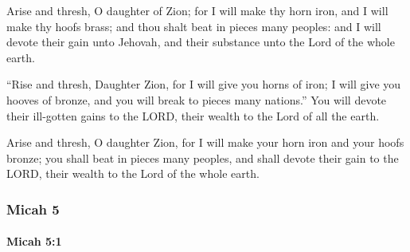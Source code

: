 			\begin{versebox}
					\item[BHS] 
					\item[LXX] 
					\item[ASV] Arise and thresh, O daughter of Zion; for I will make thy horn iron, and I will make thy hoofs brass; and thou shalt beat in pieces many peoples: and I will devote their gain unto Jehovah, and their substance unto the Lord of the whole earth.
					\item[NIV] “Rise and thresh, Daughter Zion, for I will give you horns of iron; I will give you hooves of bronze, and you will break to pieces many nations.” You will devote their ill-gotten gains to the LORD, their wealth to the Lord of all the earth.
					\item[NRSV] Arise and thresh, O daughter Zion, for I will make your horn iron and your hoofs bronze; you shall beat in pieces many peoples, and shall devote their gain to the LORD, their wealth to the Lord of the whole earth.
			\end{versebox}
	\subsubsection{Micah 5} %
		\label{MICAH-5}

		\paragraph{Micah 5:1} %
			\label{MICAH-5-1}

